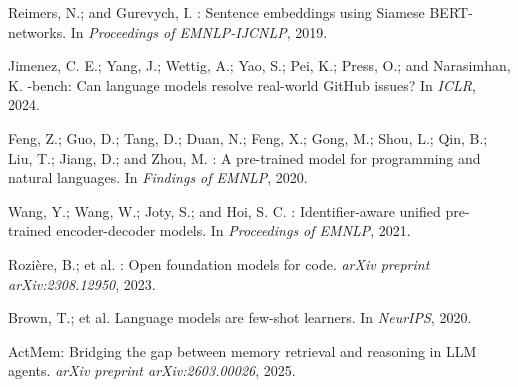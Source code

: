 \documentclass[UTF8,twocolumn]{ctexart}
\begin{document}
\begin{thebibliography}{}
Reimers, N.; and Gurevych, I.
: Sentence embeddings using {Siamese} {BERT}-networks.
\newblock In \emph{Proceedings of EMNLP-IJCNLP}, 2019.

Jimenez, C. E.; Yang, J.; Wettig, A.; Yao, S.; Pei, K.; Press, O.; and Narasimhan, K.
-bench: Can language models resolve real-world {GitHub} issues?
\newblock In \emph{ICLR}, 2024.

Feng, Z.; Guo, D.; Tang, D.; Duan, N.; Feng, X.; Gong, M.; Shou, L.; Qin, B.; Liu, T.; Jiang, D.; and Zhou, M.
: A pre-trained model for programming and natural languages.
\newblock In \emph{Findings of EMNLP}, 2020.

Wang, Y.; Wang, W.; Joty, S.; and Hoi, S. C.
: Identifier-aware unified pre-trained encoder-decoder models.
\newblock In \emph{Proceedings of EMNLP}, 2021.

Rozi\`{e}re, B.; et al.
: Open foundation models for code.
\newblock \emph{arXiv preprint arXiv:2308.12950}, 2023.

Brown, T.; et al.
\newblock Language models are few-shot learners.
\newblock In \emph{NeurIPS}, 2020.

{ActMem}: Bridging the gap between memory retrieval and reasoning in {LLM} agents.
\newblock \emph{arXiv preprint arXiv:2603.00026}, 2025.

\end{thebibliography}
\end{document}
